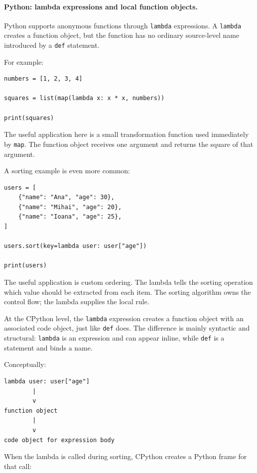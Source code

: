 \documentclass[a4paper,twoside]{report}
\begin{document}
\paragraph{Python: lambda expressions and local function objects.}

Python supports anonymous functions through \texttt{lambda} expressions. A \texttt{lambda} creates a function object, but the function has no ordinary source-level name introduced by a \texttt{def} statement.

For example:

\begin{verbatim}
numbers = [1, 2, 3, 4]

squares = list(map(lambda x: x * x, numbers))

print(squares)
\end{verbatim}

The useful application here is a small transformation function used immediately by \texttt{map}. The function object receives one argument and returns the square of that argument.

A sorting example is even more common:

\begin{verbatim}
users = [
    {"name": "Ana", "age": 30},
    {"name": "Mihai", "age": 20},
    {"name": "Ioana", "age": 25},
]

users.sort(key=lambda user: user["age"])

print(users)
\end{verbatim}

The useful application is custom ordering. The lambda tells the sorting operation which value should be extracted from each item. The sorting algorithm owns the control flow; the lambda supplies the local rule.

At the CPython level, the \texttt{lambda} expression creates a function object with an associated code object, just like \texttt{def} does. The difference is mainly syntactic and structural: \texttt{lambda} is an expression and can appear inline, while \texttt{def} is a statement and binds a name.

Conceptually:

\begin{verbatim}
lambda user: user["age"]
        |
        v
function object
        |
        v
code object for expression body
\end{verbatim}

When the lambda is called during sorting, CPython creates a Python frame for that call:
\end{document}
